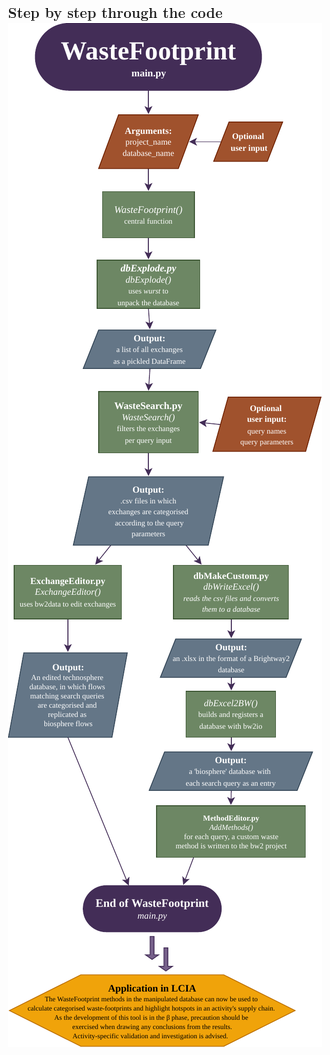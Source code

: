 \documentclass[a0paper,fleqn]{betterposter}
\begin{document}
{    {\selectfont\textbf{Step by step through the code}}\\
    \includegraphics[width=\textwidth]{img/Flowchart_WasteFootprint}\\

    }
\end{document}

